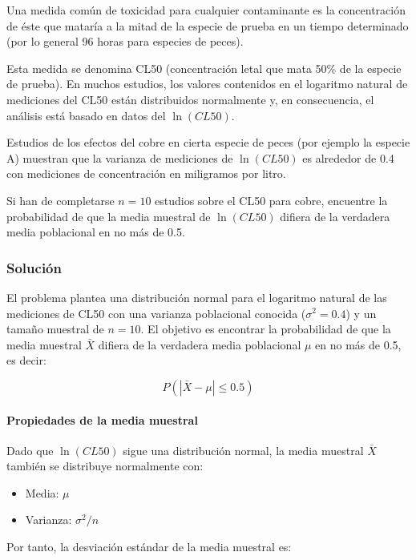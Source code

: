 \documentclass[
]{article}
\providecommand{\tightlist}{%
  \setlength{\itemsep}{0pt}\setlength{\parskip}{0pt}}
\begin{document}
Una medida común de toxicidad para cualquier contaminante es la concentración de éste que mataría a la mitad de la especie de prueba en un tiempo determinado (por lo general 96 horas para especies de peces).

Esta medida se denomina CL50 (concentración letal que mata 50\% de la especie de prueba). En muchos estudios, los valores contenidos en el logaritmo natural de mediciones del CL50 están distribuidos normalmente y, en consecuencia, el análisis está basado en datos del \(\ln(CL50)\).

Estudios de los efectos del cobre en cierta especie de peces (por ejemplo la especie A) muestran que la varianza de mediciones de \(\ln(CL50)\) es alrededor de 0.4 con mediciones de concentración en miligramos por litro.

Si han de completarse \(n=10\) estudios sobre el CL50 para cobre, encuentre la probabilidad de que la media muestral de \(\ln(CL50)\) difiera de la verdadera media poblacional en no más de 0.5.

\subsubsection{Solución}\label{soluciuxf3n-7}

El problema plantea una distribución normal para el logaritmo natural de las mediciones de CL50 con una varianza poblacional conocida (\(\sigma^2 = 0.4\)) y un tamaño muestral de \(n=10\). El objetivo es encontrar la probabilidad de que la media muestral \(\bar{X}\) difiera de la verdadera media poblacional \(\mu\) en no más de 0.5, es decir:

\[
P(|\bar{X} - \mu| \leq 0.5)
\]

\paragraph{Propiedades de la media muestral}\label{propiedades-de-la-media-muestral}

Dado que \(\ln(CL50)\) sigue una distribución normal, la media muestral \(\bar{X}\) también se distribuye normalmente con:

\begin{itemize}
\tightlist
\item
  Media: \(\mu\)
\item
  Varianza: \(\sigma^2 / n\)
\end{itemize}

Por tanto, la desviación estándar de la media muestral es:
\end{document}
